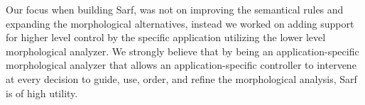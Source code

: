 \documentclass[11pt]{article}
\begin{document}
Our focus when building Sarf, was not on improving the semantical rules and 
expanding the morphological alternatives, instead we worked on adding support 
for higher level control by the specific application utilizing the lower level 
morphological analyzer. %
%
%
We strongly believe that by being
an application-specific morphological analyzer that allows an application-specific 
controller to intervene at every decision to guide, use, order, and 
refine the morphological analysis, Sarf is of high utility.
\end{document}

